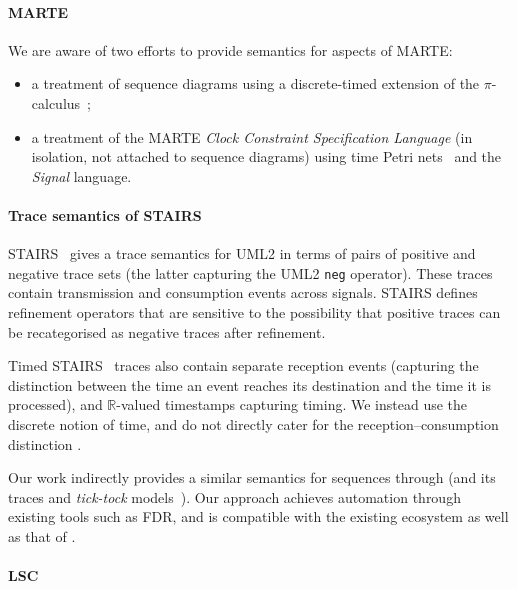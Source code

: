 \paragraph{MARTE}

We are aware of two efforts to provide semantics for aspects of MARTE:

\begin{itemize}
  \item
    a treatment of sequence diagrams using a discrete-timed extension of
    the \(\pi\)-calculus~\cite{Jin11-MARTEPiCalculus}; 
  \item 
    a treatment of the MARTE \emph{Clock Constraint Specification Language} (in
    isolation, not attached to sequence diagrams) using time Petri
    nets~\cite{Mallet09-MARTEClockNets} and the \emph{Signal} language.
\end{itemize}

\paragraph{Trace semantics of STAIRS}

STAIRS~\cite{Haugen03-STAIRS} gives a trace semantics for UML2 in terms
of pairs of positive and negative trace sets (the latter capturing the UML2
\texttt{neg} operator).  These traces contain
transmission and consumption events across signals.  STAIRS defines
refinement operators that are sensitive to the possibility that positive
traces can be recategorised as negative traces after refinement.

Timed
STAIRS~\cite{Haugen05-TimedSTAIRS} traces also contain separate reception
events (capturing the distinction between the time an event reaches
its destination and the time it is processed), and \(\mathbb R\)-valued
timestamps capturing timing.  We instead use the discrete \tockcsp{} notion
of time, and do not directly cater for the reception--consumption distinction
.

Our work indirectly provides a similar semantics for \langname{}
sequences through \tockcsp{} (and its traces and \emph{tick-tock} models~\cite{Baxter21-TickTock}).
Our approach achieves automation through existing tools such as FDR,
and is compatible with the existing \robostar{} ecosystem as well as that of
\tockcsp.

\paragraph{LSC}

